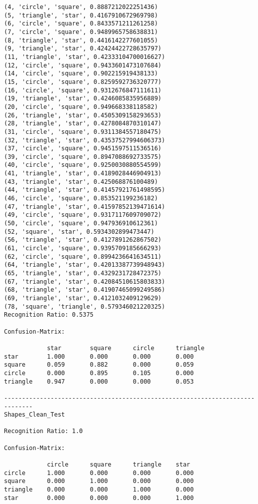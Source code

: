 \documentclass[a4paper, 10pt]{article}
\begin{document}
\begin{verbatim}
(4, 'circle', 'square', 0.8887212022251436)
(5, 'triangle', 'star', 0.4167910672969798)
(6, 'circle', 'square', 0.8433571211261258)
(7, 'circle', 'square', 0.9489965758638831)
(8, 'triangle', 'star', 0.4416142277601055)
(9, 'triangle', 'star', 0.42424422728635797)
(11, 'triangle', 'star', 0.42333104700016627)
(12, 'circle', 'square', 0.9433601473107684)
(14, 'circle', 'square', 0.902215919438133)
(15, 'circle', 'square', 0.8259592736320777)
(16, 'circle', 'square', 0.9312676847111611)
(19, 'triangle', 'star', 0.4246085835956889)
(20, 'circle', 'square', 0.949668338118582)
(26, 'triangle', 'star', 0.4505309158293653)
(28, 'triangle', 'star', 0.4278084870310147)
(31, 'circle', 'square', 0.9311384557180475)
(32, 'triangle', 'star', 0.43537527994606373)
(37, 'circle', 'square', 0.9451597511536516)
(39, 'circle', 'square', 0.8947088692733575)
(40, 'circle', 'square', 0.9250030880554599)
(41, 'triangle', 'star', 0.4189028446904913)
(43, 'triangle', 'star', 0.425068876100489)
(44, 'triangle', 'star', 0.41457921761498595)
(46, 'circle', 'square', 0.853521199236182)
(47, 'triangle', 'star', 0.41597852139471614)
(49, 'circle', 'square', 0.9317117609709072)
(50, 'circle', 'square', 0.947936910612361)
(52, 'square', 'star', 0.5934302899473447)
(56, 'triangle', 'star', 0.4127891262867502)
(61, 'circle', 'square', 0.9395709185666293)
(62, 'circle', 'square', 0.8994236641634511)
(64, 'triangle', 'star', 0.42013387739948943)
(65, 'triangle', 'star', 0.4329231728472375)
(67, 'triangle', 'star', 0.42084510615803833)
(68, 'triangle', 'star', 0.41907465099249586)
(69, 'triangle', 'star', 0.4121032409129629)
(78, 'square', 'triangle', 0.579346021220325)
Recognition Ratio: 0.5375

Confusion-Matrix:

            star        square      circle      triangle    
star        1.000       0.000       0.000       0.000       
square      0.059       0.882       0.000       0.059       
circle      0.000       0.895       0.105       0.000       
triangle    0.947       0.000       0.000       0.053       

------------------------------------------------------------------------------
Shapes_Clean_Test

Recognition Ratio: 1.0

Confusion-Matrix:

            circle      square      triangle    star        
circle      1.000       0.000       0.000       0.000       
square      0.000       1.000       0.000       0.000       
triangle    0.000       0.000       1.000       0.000       
star        0.000       0.000       0.000       1.000       


\end{verbatim}
\end{document}
